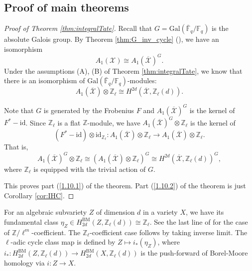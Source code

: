 \documentclass{amsart}
\theoremstyle{definition}
\theoremstyle{remark}
\newcommand{\mbb}{\mathbb}
\newcommand{\FF}{\mbb{F}}
\newcommand{\ZZ}{\mbb{Z}}
\newcommand{\mc}{\mathcal}
\newcommand{\mcX}{\mc{X}}
\begin{document}
\subsection{Proof of main theorems}\label{proof}
\begin{proof}[Proof of Theorem \ref{thm:integralTate}]
Recall that $G=\text{Gal}(\bar{\FF}_q/\FF_q)$ is the absolute Galois group.
By Theorem \ref{thm:G_inv_cycle} (\cite[Theorem 7]{Kollar_Tian}), we have an isomorphism
\[
A_1(\mcX) \cong A_1(\overline{\mcX})^G.
\]
Under the assumptions (A), (B) of Theorem \ref{thm:integralTate}, we know that there is an isomorphism of $\text{Gal}(\bar{\FF}_q/\FF_q)$-modules:
\[
A_1(\overline{\mcX}) \otimes \ZZ_\ell \cong H^{2d}(\overline{\mcX}, \ZZ_\ell(d)).
\]

Note that $G$ is generated by the Frobenius $F$ and $A_1(\overline{\mcX})^G$ is the kernel of $F^*-\text{id}$. Since $\ZZ_\ell$ is a flat $\ZZ$-module, we have $A_1(\overline{\mcX})^G\otimes \ZZ_\ell$ is the kernel of $$(F^*-\text{id})\otimes \text{id}_{\ZZ_\ell}: A_1(\overline{\mcX})\otimes \ZZ_\ell \to A_1(\overline{\mcX})\otimes \ZZ_\ell.$$ That is,
\[
A_1(\overline{\mcX})^G \otimes \ZZ_\ell \cong (A_1(\overline{\mcX})\otimes \ZZ_\ell)^G \cong H^{2d}(\overline{\mcX}, \ZZ_\ell(d))^G,
\]
where $\ZZ_\ell$ is equipped with the trivial action of $G$.

This proves part (\ref{1.10.1}) of the theorem. Part (\ref{1.10.2}) of the theorem is just Corollary \ref{cor:IHC}.
\end{proof}
For an algebraic subvariety $Z$ of dimension $d$ in a variety $X$, we have its fundamental class $\eta_Z \in H_{2d}^{\text{BM}}(Z, \ZZ_\ell(d))\cong \ZZ_\ell$. 
See the last line of \cite[Example 2.1]{BlochOgus} for the case of $\ZZ/\ell^m$-coefficient. The $\ZZ_\ell$-coefficient case follows by taking inverse limit.
The $\ell$-adic cycle class map is defined by $Z \mapsto i_*(\eta_
Z)$, where $i_*: H_{2d}^{\text{BM}}(Z, \ZZ_\ell(d))\to H_{2d}^{\text{BM}}(X, \ZZ_\ell(d))$ is the push-forward of Borel-Moore homology via $i:Z \to X$.
\end{document}
